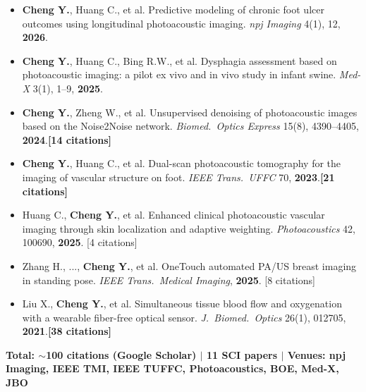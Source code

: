 \documentclass[letterpaper,10pt]{article}
\begin{document}
\begin{itemize}[leftmargin=0.2in, itemsep=1pt]
  \item \small \textbf{Cheng Y.}, Huang C., et al. Predictive modeling of chronic foot ulcer outcomes using longitudinal photoacoustic imaging. \textit{npj Imaging} 4(1), 12, \textbf{2026}.
  \item \small \textbf{Cheng Y.}, Huang C., Bing R.W., et al. Dysphagia assessment based on photoacoustic imaging: a pilot ex vivo and in vivo study in infant swine. \textit{Med-X} 3(1), 1--9, \textbf{2025}.
  \item \small \textbf{Cheng Y.}, Zheng W., et al. Unsupervised denoising of photoacoustic images based on the Noise2Noise network. \textit{Biomed.\ Optics Express} 15(8), 4390--4405, \textbf{2024}.\quad\textbf{[14 citations]}
  \item \small \textbf{Cheng Y.}, Huang C., et al. Dual-scan photoacoustic tomography for the imaging of vascular structure on foot. \textit{IEEE Trans.\ UFFC} 70, \textbf{2023}.\quad\textbf{[21 citations]}
  \item \small Huang C., \textbf{Cheng Y.}, et al. Enhanced clinical photoacoustic vascular imaging through skin localization and adaptive weighting. \textit{Photoacoustics} 42, 100690, \textbf{2025}. [4 citations]
  \item \small Zhang H., ..., \textbf{Cheng Y.}, et al. OneTouch automated PA/US breast imaging in standing pose. \textit{IEEE Trans.\ Medical Imaging}, \textbf{2025}. [8 citations]
  \item \small Liu X., \textbf{Cheng Y.}, et al. Simultaneous tissue blood flow and oxygenation with a wearable fiber-free optical sensor. \textit{J.\ Biomed.\ Optics} 26(1), 012705, \textbf{2021}.\quad\textbf{[38 citations]}
\end{itemize}
\vspace{2pt}
\noindent\small\textbf{Total: $\sim$100 citations (Google Scholar) $|$ 11 SCI papers $|$ Venues: npj Imaging, IEEE TMI, IEEE TUFFC, Photoacoustics, BOE, Med-X, JBO}

\vspace{-2pt}

\end{document}
